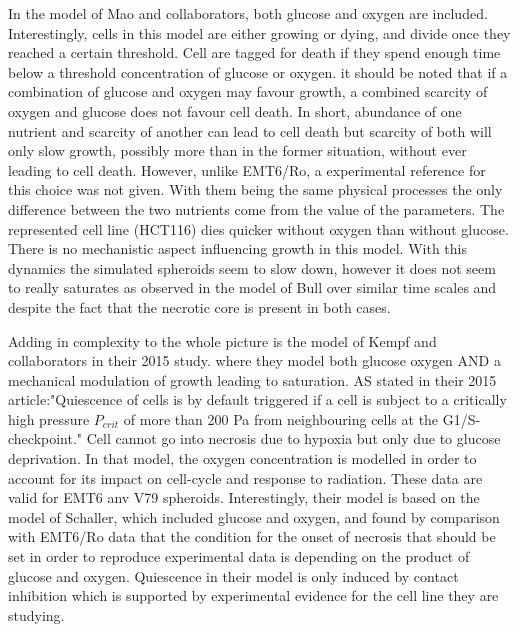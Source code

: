 \documentclass[11pt,a4paper]{article}
\begin{document}
In the model of Mao and collaborators, both glucose and oxygen are included.\cite{Mao2018} Interestingly, cells in this model are either growing or dying, and divide once they reached a certain threshold. Cell are tagged for death if they spend enough time below a threshold concentration of glucose or oxygen.  it should be noted that if a combination of glucose and oxygen may favour growth, a combined scarcity of oxygen and glucose does not favour cell death. In short, abundance of one nutrient and scarcity of another can lead to cell death but scarcity of both will only slow growth, possibly more than in the former situation, without ever leading to cell death. However, unlike EMT6/Ro, a experimental reference for this choice was not given. With them being the same physical processes the only difference between the two nutrients come from the value of the parameters. The represented cell line (HCT116) dies quicker without oxygen than without glucose. There is no mechanistic aspect influencing growth in this model. With this dynamics the simulated spheroids seem to slow down, however it does not seem to really saturates as observed in the model of Bull over similar time scales and despite the fact that the necrotic core is present in both cases.

Adding in complexity to the whole picture is the model of Kempf and collaborators in their 2015 study. where they model both glucose oxygen AND a mechanical modulation of growth leading to saturation. AS stated in their 2015 article:"Quiescence of cells is by default triggered if a cell is subject to a critically high
pressure $P_{crit}$ of more than 200 Pa from neighbouring cells at the G1/S-checkpoint." Cell cannot go into necrosis due to hypoxia but only due to glucose deprivation. In that model, the oxygen concentration is modelled in order to account for its impact on cell-cycle and response to radiation. These data are valid for EMT6 anv V79 spheroids. Interestingly, their model is based on the model of Schaller,\cite{Kempf2005} which included glucose and oxygen, and found by comparison with EMT6/Ro data that the condition for the onset of necrosis that should be set in order to reproduce experimental data is depending on the product of glucose and oxygen. Quiescence in their model is only induced by contact inhibition which is supported by experimental evidence for the cell line they are studying.
\end{document}
